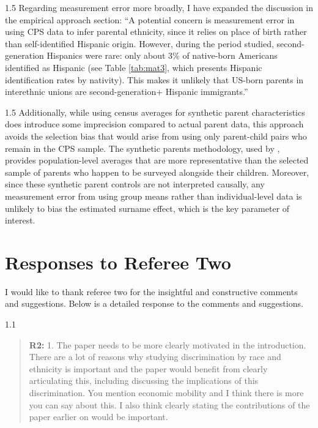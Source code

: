 \documentclass[12pt,english]{article}
\newcommand{\rrquote}{1.1}
\newcommand{\rrxspc}{1.5}
\begin{document}
\begin{refsection}
\begin{spacing}{\rrxspc}     
    Regarding measurement error more broadly, I have expanded the discussion in the empirical approach section: ``A potential concern is measurement error in using CPS data to infer parental ethnicity, since it relies on place of birth rather than self-identified Hispanic origin. However, during the period studied, second-generation Hispanics were rare: only about 3\% of native-born Americans identified as Hispanic (see Table \ref{tab:mat3}, which presents Hispanic identification rates by nativity). This makes it unlikely that US-born parents in interethnic unions are second-generation+ Hispanic immigrants.''
    \end{spacing}
\begin{spacing}{\rrxspc}
    Additionally, while using census averages for synthetic parent characteristics does introduce some imprecision compared to actual parent data, this approach avoids the selection bias that would arise from using only parent-child pairs who remain in the CPS sample. The synthetic parents methodology, used by \textcite{rubinstein2014pride}, provides population-level averages that are more representative than the selected sample of parents who happen to be surveyed alongside their children. Moreover, since these synthetic parent controls are not interpreted causally, any measurement error from using group means rather than individual-level data is unlikely to bias the estimated surname effect, which is the key parameter of interest.
    \end{spacing}

\clearpage
\pagebreak

    \section{Responses to Referee Two}
    I would like to thank referee two for the insightful and constructive comments and suggestions. Below is a detailed response to the comments and suggestions.

    \begin{spacing}{\rrquote}
        \begin{quotation}
        \textbf{R2: } 1. The paper needs to be more clearly motivated in the introduction. There are a lot of reasons why studying discrimination by race and ethnicity is important and the paper would benefit from clearly articulating this, including discussing the implications of this discrimination. You mention economic mobility and I think there is more you can say about this. I also think clearly stating the contributions of the paper earlier on would be important.
        \end{quotation}
        \end{spacing}
        

\end{refsection}
\end{document}
